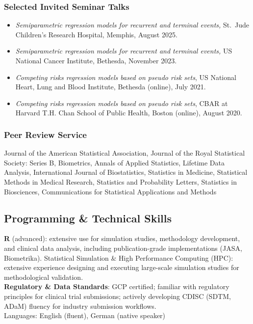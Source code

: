 \documentclass[a4paper,11pt]{article}
\begin{document}
\subsubsection*{\large Selected Invited Seminar Talks}\vspace{-0.95ex}
\begin{itemize}
	\item[$1.$] {\em Semiparametric regression models for recurrent and terminal events,} St.\ Jude Children's Research Hospital, Memphis, August 2025.
	\vspace{-1ex}
	\item[$2.$] {\em Semiparametric regression models for recurrent and terminal events,} US National Cancer Institute, Bethesda, November 2023.
	\vspace{-1ex}
	\item[$3.$] {\em Competing risks regression models based on pseudo risk sets}, US National Heart, Lung and Blood Institute, Bethesda (online), July 2021.
	\vspace{-1ex}
	\item[$4.$] {\em Competing risks regression models based on pseudo risk sets}, CBAR at Harvard T.H. Chan School of Public Health, Boston (online), August 2020.
	\vspace{-1ex}
\end{itemize}

\vspace{-0.5ex}
\subsubsection*{\large Peer Review Service}
\vspace{-0.8ex}
Journal of the American Statistical Association, Journal of the Royal Statistical Society: Series B, Biometrics, Annals of Applied Statistics, Lifetime Data Analysis, International Journal of Biostatistics, Statistics in Medicine, Statistical Methods in Medical Research, Statistics and Probability Letters, Statistics in Biosciences, Communications for Statistical Applications and Methods

\vspace{-0.4cm}
\subsection*{\large Programming \& Technical Skills}\vspace{-0.8ex}
{\bf R} (advanced): extensive use for simulation studies, methodology development, and clinical data analysis, including publication-grade implementations (JASA, Biometrika). Statistical Simulation \& High Performance Computing (HPC): extensive experience designing and executing large-scale simulation studies for methodological validation.\\[1ex]
{\bf\large  Regulatory \& Data Standards}: GCP certified; familiar with regulatory principles for clinical trial submissions; actively developing CDISC (SDTM, ADaM) fluency for industry submission workflows.
\\[0.5cm]
{\large Languages}: English (fluent), German (native speaker)
\end{document}
